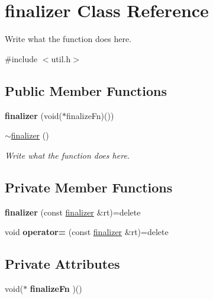 \hypertarget{classfinalizer}{\section{finalizer Class Reference}
\label{classfinalizer}
}


Write what the function does here.  




{\ttfamily \#include $<$util.\+h$>$}

\subsection*{Public Member Functions}
\begin{DoxyCompactItemize}
\item 
\hypertarget{classfinalizer_abfb1a53ac8097489f7f832fab70ed438}{{\bfseries finalizer} (void($\ast$finalize\+Fn)())}\label{classfinalizer_abfb1a53ac8097489f7f832fab70ed438}

\item 
\hyperlink{classfinalizer_a5dd96a3bece0e0dc19686da3eeafbd0d}{$\sim$finalizer} ()
\begin{DoxyCompactList}\small\item\em Write what the function does here. \end{DoxyCompactList}\end{DoxyCompactItemize}
\subsection*{Private Member Functions}
\begin{DoxyCompactItemize}
\item 
\hypertarget{classfinalizer_ae13d210c53c985301d67b6744f6455de}{{\bfseries finalizer} (const \hyperlink{classfinalizer}{finalizer} \&rt)=delete}\label{classfinalizer_ae13d210c53c985301d67b6744f6455de}

\item 
\hypertarget{classfinalizer_aea0825760a746dad9f22299960bc83c8}{void {\bfseries operator=} (const \hyperlink{classfinalizer}{finalizer} \&rt)=delete}\label{classfinalizer_aea0825760a746dad9f22299960bc83c8}

\end{DoxyCompactItemize}
\subsection*{Private Attributes}
\begin{DoxyCompactItemize}
\item 
\hypertarget{classfinalizer_ac9a4efb8dc93d75de3fb6561ebb59d0a}{void($\ast$ {\bfseries finalize\+Fn} )()}\label{classfinalizer_ac9a4efb8dc93d75de3fb6561ebb59d0a}

\end{DoxyCompactItemize}


